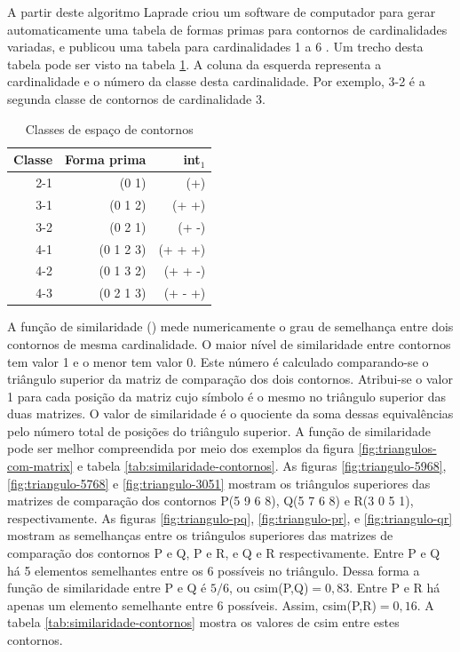 A partir deste algoritmo Laprade criou um software de computador para
gerar automaticamente uma tabela de formas primas para contornos de
cardinalidades variadas, e publicou uma tabela para cardinalidades 1 a
6 \cite[p. 257]{marvin.ea87:relating}. Um trecho desta tabela pode ser
visto na tabela \ref{tab:c-space-segment-classes}. A coluna da
esquerda representa a cardinalidade e o número da classe desta
cardinalidade. Por exemplo, 3-2 é a segunda classe de contornos de
cardinalidade 3.

\begin{table}
  \centering
  \begin{tabular}{r|rr}
    Classe & Forma prima & int$_1$ \\
    \hline
    2-1 & (0 1) & (+) \\
    3-1 & (0 1 2) & (+ +) \\
    3-2 & (0 2 1) & (+ -) \\
    4-1 & (0 1 2 3) & (+ + +) \\
    4-2 & (0 1 3 2) & (+ + -) \\
    4-3 & (0 2 1 3) & (+ - +)
  \end{tabular}
  \caption{Classes de espaço de contornos}
  \label{tab:c-space-segment-classes}
\end{table}

A função de similaridade () mede numericamente o grau de
semelhança entre dois contornos de mesma cardinalidade. O maior nível
de similaridade entre contornos tem valor 1 e o menor tem valor
0. Este número é calculado comparando-se o triângulo superior da
matriz de comparação dos dois contornos. Atribui-se o valor 1 para
cada posição da matriz cujo símbolo é o mesmo no triângulo superior
das duas matrizes. O valor de similaridade é o quociente da soma
dessas equivalências pelo número total de posições do triângulo
superior. A função de similaridade pode ser melhor compreendida por
meio dos exemplos da figura \ref{fig:triangulos-com-matrix} e tabela
\ref{tab:similaridade-contornos}. As figuras \ref{fig:triangulo-5968},
\ref{fig:triangulo-5768} e \ref{fig:triangulo-3051} mostram os
triângulos superiores das matrizes de comparação dos contornos P(5 9 6
8), Q(5 7 6 8) e R(3 0 5 1), respectivamente. As figuras
\ref{fig:triangulo-pq}, \ref{fig:triangulo-pr}, e
\ref{fig:triangulo-qr} mostram as semelhanças entre os triângulos
superiores das matrizes de comparação dos contornos P e Q, P e R, e Q
e R respectivamente. Entre P e Q há 5 elementos semelhantes entre os 6
possíveis no triângulo. Dessa forma a função de similaridade entre P e
Q é $5/6$, ou csim(P,Q)$=0,83$. Entre P e R há apenas um elemento
semelhante entre 6 possíveis. Assim, csim(P,R)$=0,16$. A tabela
\ref{tab:similaridade-contornos} mostra os valores de csim entre estes
contornos.


